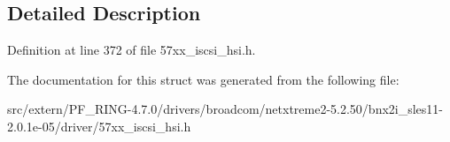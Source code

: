 \subsection{Detailed Description}


Definition at line 372 of file 57xx\_\-iscsi\_\-hsi.h.



The documentation for this struct was generated from the following file:\begin{DoxyCompactItemize}
\item 
src/extern/PF\_\-RING-\/4.7.0/drivers/broadcom/netxtreme2-\/5.2.50/bnx2i\_\-sles11-\/2.0.1e-\/05/driver/57xx\_\-iscsi\_\-hsi.h\end{DoxyCompactItemize}
